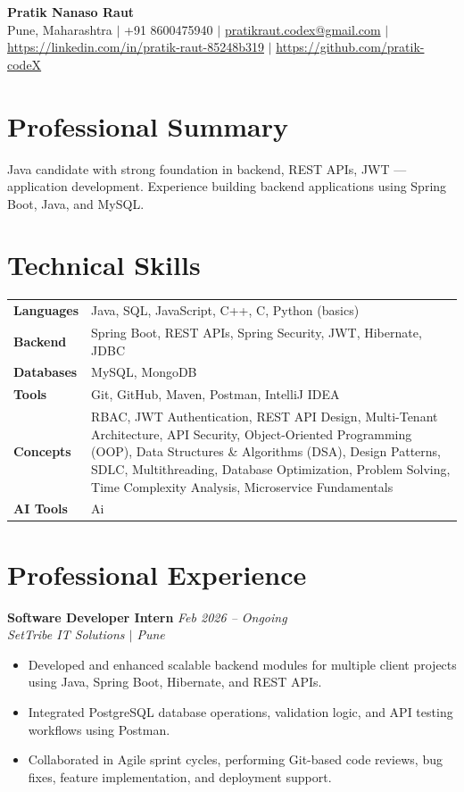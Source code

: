\documentclass[10.5pt,a4paper]{article}
\begin{document}
\begin{center}
{\Large\bfseries Pratik Nanaso Raut}\\[2pt]
Pune, Maharashtra $|$ +91 8600475940 $|$ \href{mailto:pratikraut.codex@gmail.com}{pratikraut.codex@gmail.com} $|$ \href{https://linkedin.com/in/pratik-raut-85248b319}{https://linkedin.com/in/pratik-raut-85248b319} $|$ \href{https://github.com/pratik-codeX}{https://github.com/pratik-codeX}
\end{center}
\vspace{-2pt}
\section{Professional Summary}
Java candidate with strong foundation in backend, REST APIs, JWT — application development. Experience building backend applications using Spring Boot, Java, and MySQL.
\section{Technical Skills}
\begin{tabular}{@{}p{}p{}@{}}
\textbf{Languages} & Java, SQL, JavaScript, C++, C, Python (basics) \\[1pt]
\textbf{Backend} & Spring Boot, REST APIs, Spring Security, JWT, Hibernate, JDBC \\[1pt]
\textbf{Databases} & MySQL, MongoDB \\[1pt]
\textbf{Tools} & Git, GitHub, Maven, Postman, IntelliJ IDEA \\[1pt]
\textbf{Concepts} & RBAC, JWT Authentication, REST API Design, Multi-Tenant Architecture, API Security, Object-Oriented Programming (OOP), Data Structures \& Algorithms (DSA), Design Patterns, SDLC, Multithreading, Database Optimization, Problem Solving, Time Complexity Analysis, Microservice Fundamentals \\[1pt]
\textbf{AI Tools} & Ai \\
\end{tabular}
\section{Professional Experience}
\textbf{Software Developer Intern} \hfill \textit{Feb 2026 -- Ongoing}
\\\textit{SetTribe IT Solutions $|$ Pune}
\begin{itemize}
  \item Developed and enhanced scalable backend modules for multiple client projects using Java, Spring Boot, Hibernate, and REST APIs.
  \item Integrated PostgreSQL database operations, validation logic, and API testing workflows using Postman.
  \item Collaborated in Agile sprint cycles, performing Git-based code reviews, bug fixes, feature implementation, and deployment support.
\end{itemize}
\end{document}
